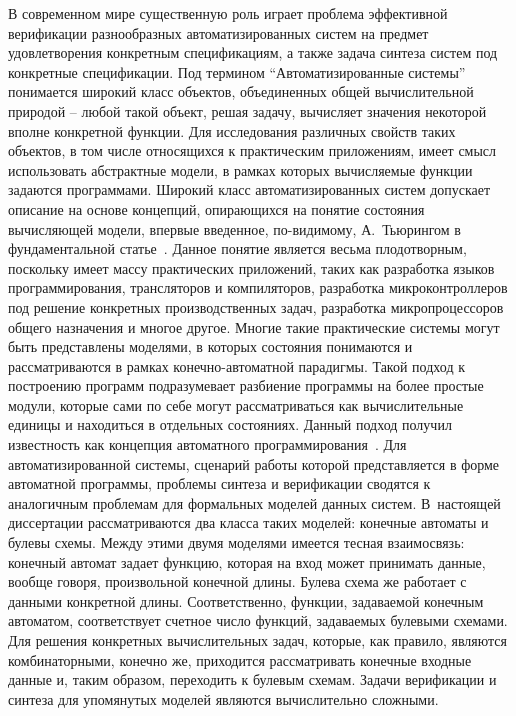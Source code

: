 \actuality
%
В современном мире существенную роль играет проблема эффективной верификации разнообразных автоматизированных систем на предмет удовлетворения конкретным спецификациям, а также задача синтеза систем под конкретные спецификации.
Под термином \enquote{Автоматизированные системы} понимается широкий класс объектов, объединенных общей вычислительной природой \--- любой такой объект, решая задачу, вычисляет значения некоторой вполне конкретной функции.
Для исследования различных свойств таких объектов, в том числе относящихся к практическим приложениям, имеет смысл использовать абстрактные модели, в рамках которых вычисляемые функции задаются программами.
Широкий класс автоматизированных систем допускает описание на основе концепций, опирающихся на понятие состояния вычисляющей модели, впервые введенное, по-видимому, А.~Тьюрингом в фундаментальной статье~\autocite{turing1937}.
Данное понятие является весьма плодотворным, поскольку имеет массу практических приложений, таких как разработка языков программирования, трансляторов и компиляторов, разработка микроконтроллеров под решение конкретных производственных задач, разработка микропроцессоров общего назначения и многое другое.
Многие такие практические системы могут быть представлены моделями, в которых состояния понимаются и рассматриваются в рамках конечно-автоматной парадигмы.
Такой подход к построению программ подразумевает разбиение программы на более простые модули, которые сами по себе могут рассматриваться как вычислительные единицы и находиться в отдельных состояниях.
Данный подход получил известность как концепция автоматного программирования~\autocite{polikarpova2009}.
Для автоматизированной системы, сценарий работы которой представляется в форме автоматной программы, проблемы синтеза и верификации сводятся к аналогичным проблемам для формальных моделей данных систем.
В~настоящей диссертации рассматриваются два класса таких моделей: конечные автоматы и булевы схемы.
Между этими двумя моделями имеется тесная взаимосвязь: конечный автомат задает функцию, которая на вход может принимать данные, вообще говоря, произвольной конечной длины.
Булева схема же работает с данными конкретной длины.
Соответственно, функции, задаваемой конечным автоматом, соответствует счетное число функций, задаваемых булевыми схемами. Для решения конкретных вычислительных задач, которые, как правило, являются комбинаторными, конечно же, приходится рассматривать конечные входные данные и, таким образом, переходить к булевым схемам.
Задачи верификации и синтеза для упомянутых моделей являются вычислительно сложными.
